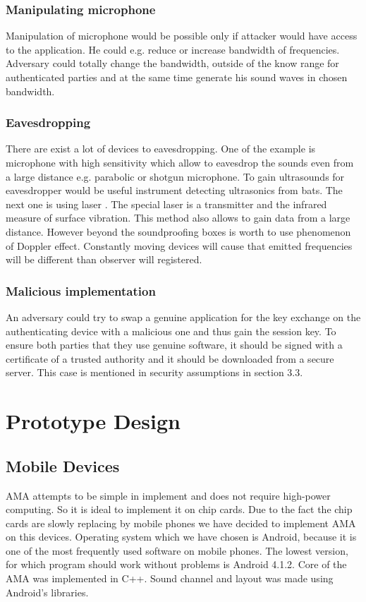\documentclass[11pt,titlepage]{article}
\theoremstyle{plain}
\begin{document}
\subsubsection{Manipulating microphone}
Manipulation of microphone would be possible only if attacker would have access to the application. He could e.g. reduce or increase bandwidth of frequencies. Adversary could totally change the bandwidth, outside of the know range for authenticated parties and at the same time generate his sound waves in chosen bandwidth.

\subsubsection{Eavesdropping}
There are exist a lot of devices to eavesdropping. One of the example is microphone with high sensitivity which allow to eavesdrop the sounds even from a large distance e.g. parabolic or shotgun  microphone. To gain ultrasounds for eavesdropper would be useful instrument detecting ultrasonics from bats. The next one is using laser \cite{laser_mic}. The special laser is a transmitter and the infrared measure of surface vibration. This method also allows to gain data from a large distance. However beyond the soundproofing boxes is worth to use phenomenon of Doppler effect. Constantly moving devices will cause that emitted frequencies will be different than observer will registered. 

\subsubsection{Malicious implementation}
An adversary could try to swap a genuine application for the key exchange on the authenticating device with a malicious one and thus gain the session key. To ensure both parties that they use genuine software, it should be signed with a certificate of a trusted authority and it should be downloaded from a secure server. This case is mentioned in security assumptions in section 3.3.



\section{Prototype Design}
\subsection{Mobile Devices}

AMA attempts to be simple in implement and does not require high-power computing. So it is ideal to implement it on chip cards. Due to the fact the chip cards are slowly replacing by mobile phones we have decided to implement AMA on this devices. Operating system which we have chosen is Android, because it is one of the most frequently used software on mobile phones. The lowest version, for which program should work without problems is Android 4.1.2. Core of the AMA was implemented in C++. Sound channel and layout was made using Android's libraries. 
\end{document}
